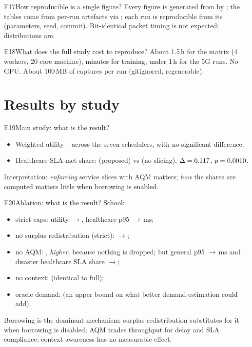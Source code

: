 \begin{qa}{E17}{How reproducible is a single figure?}
Every figure is generated from  by ; the tables come from per-run
artefacts via ; each run is reproducible from its  (parameters, seed, commit).
Bit-identical packet timing is not expected; distributions are.
\end{qa}

\begin{qa}{E18}{What does the full study cost to reproduce?}
About 1.5\,h for the matrix (4 workers, 20-core machine), minutes for training, under 1\,h for the 5G runs. No GPU.
About 100\,MB of captures per run (gitignored, regenerable).
\end{qa}

\section{Results by study}

\begin{qa}{E19}{Main study: what is the result?}
\begin{itemize}
\item Weighted utility \NUtilMin--\NUtilMax{} across the seven schedulers, with no significant difference.
\item Healthcare SLA-met share: \NHcSlaProposed{} (proposed) vs \NHcSlaNoSlicing{} (no slicing),
$\Delta=0.117$, $p=0.0010$.
\end{itemize}
Interpretation: \emph{enforcing} service slices with AQM matters; \emph{how} the shares are computed matters little
when borrowing is enabled.
\end{qa}

\begin{qa}{E20}{Ablation: what is the result?}
School:
\begin{itemize}
\item strict caps: utility \NAblSchoolFullUtil$\rightarrow$\NAblSchoolFullStrictUtil, healthcare p95
\NAblSchoolFullHc$\rightarrow$\NAblSchoolFullStrictHc\,ms;
\item no surplus redistribution (strict): $\rightarrow$\NAblSchoolNoSurplusStrictUtil;
\item no AQM: \NAblSchoolNoAqmUtil{}, \emph{higher}, because nothing is dropped; but general p95 \NAblSchoolFullGenP$\rightarrow$\NAblSchoolNoAqmGenP\,ms
and disaster healthcare SLA share \NAblDisasterFullHcSla$\rightarrow$\NAblDisasterNoAqmHcSla;
\item no context: \NAblSchoolNoContextUtil{} (identical to full);
\item oracle demand: \NAblSchoolOracleDemandUtil{} (an upper bound on what better demand estimation could add).
\end{itemize}
Borrowing is the dominant mechanism; surplus redistribution substitutes for it when borrowing is disabled; AQM trades
throughput for delay and SLA compliance; context awareness has no measurable effect.
\end{qa}

